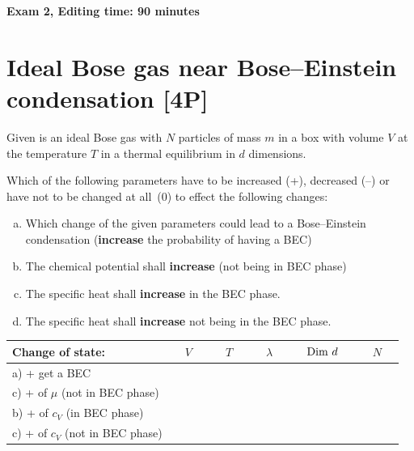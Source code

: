 \documentclass[12pt,a4paper]{article} %
\begin{document}
 
 
 \vspace{1cm}\begin{center}
{\Large \bf Exam 2, Editing time: 90 minutes}
\end{center}

\section{Ideal Bose gas near Bose--Einstein condensation [4P]}
Given is an ideal Bose gas with $N$ particles of mass $m$ in a box with volume $V$ at the temperature $T$ in a thermal equilibrium in $d$ dimensions.


Which of the following parameters have to be increased (+), decreased (--) or have not to be changed at all~(0) to effect the following changes:
\begin{enumerate}[a)]
 \item Which change of the given parameters could lead to a Bose--Einstein condensation (\textbf{increase} the probability of having a BEC)
 \item The chemical potential shall {\bf increase} (not being in BEC phase)
 \item The specific heat shall {\bf increase} in the BEC phase.
 \item The specific heat shall {\bf increase} not being in the BEC phase.
\end{enumerate}


\begin{table}[h]
\begin{center}
 \begin{tabular}{|l| c|c|c|c|c|}
 \hline 
  Change of state: & $\quad V \quad$ & $\quad T \quad $ & $\quad \lambda \quad$ & $\quad \textnormal{Dim } d \quad$ & $\quad N \quad$ \\
  \hline \hline
  a) + get a BEC & &&&& \\ \hline
  c) + of $\mu$ (not in BEC phase)& &&&& \\ \hline
  b) + of $c_V$ (in BEC phase)  & &&&& \\ \hline
  c) + of $c_V$ (not in BEC phase)  & &&& & \\ \hline
 \end{tabular}
\end{center}
\end{table}
 
\end{document}
